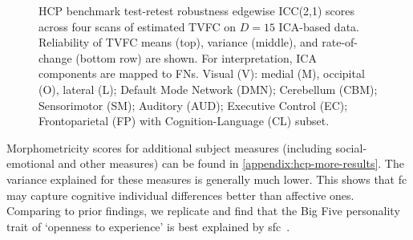 \begin{figure}[t]
  \caption{
    HCP benchmark test-retest robustness edgewise ICC(2,1) scores across four scans of estimated TVFC on $D = 15$ ICA-based data.
    Reliability of TVFC means (top), variance (middle), and rate-of-change (bottom row) are shown.
    For interpretation, ICA components are mapped to FNs.
    Visual (V): medial (M), occipital (O), lateral (L); Default Mode Network (DMN); Cerebellum (CBM); Sensorimotor (SM); Auditory (AUD); Executive Control (EC); Frontoparietal (FP) with Cognition-Language (CL) subset.
  }\label{fig:hcp-results-test-retest-ICCs-d15}
\end{figure}


Morphometricity scores for additional subject measures (including social-emotional and other measures) can be found in \cref{appendix:hcp-more-results}.
The variance explained for these measures is generally much lower.
This shows that \gls{fc} may capture cognitive individual differences better than affective ones.
Comparing to prior findings, we replicate \textcite{Dubois2018} and find that the Big Five personality trait of `openness to experience' is best explained by \gls{sfc}~\parencite[see also][]{Beaty2018}.

